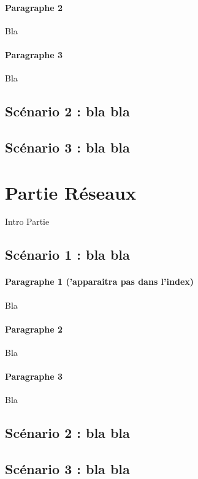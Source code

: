 \paragraph*{Paragraphe 2} Bla

\paragraph*{Paragraphe 3} Bla

\newpage

\subsection{Scénario 2 : bla bla }


\subsection{Scénario 3 : bla bla }


\section{Partie Réseaux }

Intro
Partie

\subsection{Scénario 1 : bla bla }

\paragraph*{Paragraphe 1 ('apparaitra pas dans l'index)} Bla

\paragraph*{Paragraphe 2} Bla

\paragraph*{Paragraphe 3} Bla

\newpage

\subsection{Scénario 2 : bla bla }


\subsection{Scénario 3 : bla bla }



